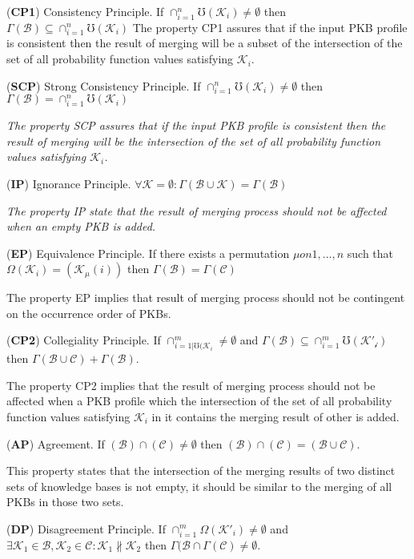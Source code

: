 \documentclass[]{iosart2c}
\begin{document}
(\textbf{CP1}) Consistency Principle. If $\cap^n_{i=1}\mho(\mathcal{K}_i) \neq \emptyset$ then $\Gamma(\mathcal{B}) \subseteq \cap^n_{i=1}\mho(\mathcal{K}_i)$
The property CP1 assures that if the input PKB profile is consistent then the result of merging will be a subset of the intersection of the set of all probability function values satisfying $\mathcal{K}_i$.

(\textbf{SCP}) Strong Consistency Principle. If $\cap^n_{i=1}\mho(\mathcal{K}_i) \neq \emptyset$ then $\Gamma(\mathcal{B}) = \cap^n_{i=1}\mho(\mathcal{K}_i)$

\textit{The property SCP assures that if the input PKB profile is consistent then the result of merging will be the intersection of the set of all probability function
values satisfying $\mathcal{K}_i$.}

(\textbf{IP}) Ignorance Principle. $\forall \mathcal{K} = \emptyset : \Gamma(\mathcal{B} \cup \mathcal{K}) = \Gamma(\mathcal{B})$

\textit{The property IP state that the result of merging process should not be affected when an empty PKB is added.}

(\textbf{EP}) Equivalence Principle. If there exists a permutation $\mu on {1, ... , n}$ such that $\Omega(\mathcal{K}_i) = (\mathcal{K}_\mu(i))$ then $\Gamma(\mathcal{B}) =  \Gamma(\mathcal{C})$

The property EP implies that result of merging process should not be contingent on the occurrence order of PKBs.

(\textbf{CP2}) Collegiality Principle. If $\cap^m_{i=1|\mho(\mathcal{K}_i} \neq \emptyset$ and $\Gamma(\mathcal{B}) \subseteq \cap^m_{i=1}\mho(\mathcal{K'_i})$ then $\Gamma(\mathcal{B} \cup \mathcal{C}) + \Gamma(\mathcal{B})$.

The property CP2 implies that the result of merging process should not be affected when a PKB profile which the intersection of the set of all probability function values satisfying $\mathcal{K}_i$ in it contains the merging result of other is added.

(\textbf{AP}) Agreement. If $(\mathcal{B}) \cap (\mathcal{C}) \neq \emptyset$ then $(\mathcal{B}) \cap (\mathcal{C}) = (\mathcal{B} \cup \mathcal{C})$.

This property states that the intersection of the merging results of two distinct sets of knowledge bases is not empty, it should be similar to the merging of all PKBs in those two sets.

(\textbf{DP}) Disagreement Principle. If $\cap^m_{i=1}\Omega(\mathcal{K}'_i) \neq \emptyset$ and $\exists \mathcal{K}_1 \in \mathcal{B}, \mathcal{K}_2 \in \mathcal{C}: \mathcal{K}_1 \nparallel \mathcal{K}_2$ then $\Gamma(\mathcal{B} \cap \Gamma(\mathcal{C}) \neq \emptyset$.
\end{document}
